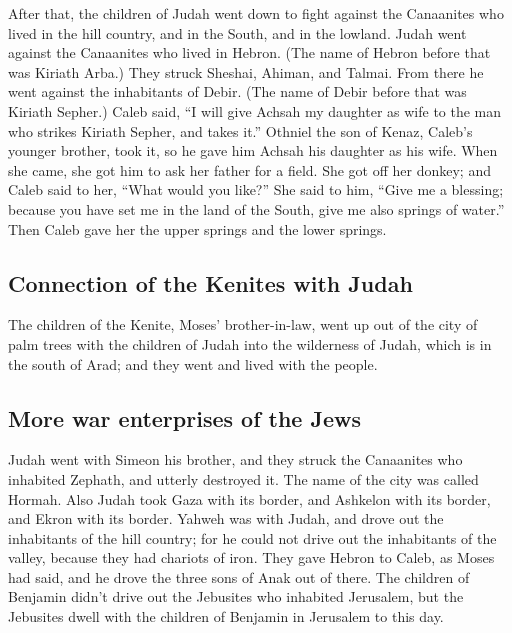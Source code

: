  After that, the children of Judah went down to fight
against the Canaanites who lived in the hill country, and in the South,
and in the lowland.  Judah went against the Canaanites
who lived in Hebron. (The name of Hebron before that was Kiriath Arba.)
They struck Sheshai, Ahiman, and Talmai.  From there he
went against the inhabitants of Debir. (The name of Debir before that
was Kiriath Sepher.)  Caleb said, ``I will give Achsah my
daughter as wife to the man who strikes Kiriath Sepher, and takes it.''
 Othniel the son of Kenaz, Caleb's younger brother, took
it, so he gave him Achsah his daughter as his wife.  When
she came, she got him to ask her father for a field. She got off her
donkey; and Caleb said to her, ``What would you like?'' 
She said to him, ``Give me a blessing; because you have set me in the
land of the South, give me also springs of water.'' Then Caleb gave her
the upper springs and the lower springs.

\hypertarget{connection-of-the-kenites-with-judah}{%
\subsection{Connection of the Kenites with
Judah}\label{connection-of-the-kenites-with-judah}}

 The children of the Kenite, Moses' brother-in-law, went
up out of the city of palm trees with the children of Judah into the
wilderness of Judah, which is in the south of Arad; and they went and
lived with the people.

\hypertarget{more-war-enterprises-of-the-jews}{%
\subsection{More war enterprises of the
Jews}\label{more-war-enterprises-of-the-jews}}

 Judah went with Simeon his brother, and they struck the
Canaanites who inhabited Zephath, and utterly destroyed it. The name of
the city was called Hormah.  Also Judah took Gaza with
its border, and Ashkelon with its border, and Ekron with its border.
 Yahweh was with Judah, and drove out the inhabitants of
the hill country; for he could not drive out the inhabitants of the
valley, because they had chariots of iron.  They gave
Hebron to Caleb, as Moses had said, and he drove the three sons of Anak
out of there.  The children of Benjamin didn't drive out
the Jebusites who inhabited Jerusalem, but the Jebusites dwell with the
children of Benjamin in Jerusalem to this day.

